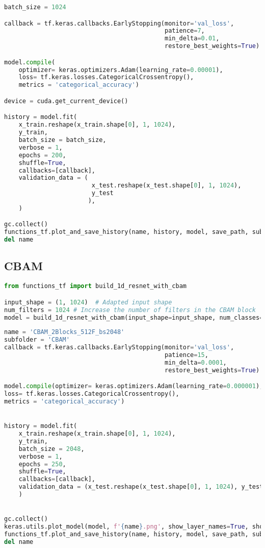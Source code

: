 \begin{lstlisting}[language=Python]
batch_size = 1024

callback = tf.keras.callbacks.EarlyStopping(monitor='val_loss', 
                                            patience=7, 
                                            min_delta=0.01,
                                            restore_best_weights=True)

model.compile(
    optimizer= keras.optimizers.Adam(learning_rate=0.00001),
    loss= tf.keras.losses.CategoricalCrossentropy(),
    metrics = 'categorical_accuracy')

device = cuda.get_current_device()

history = model.fit(
    x_train.reshape(x_train.shape[0], 1, 1024),
    y_train,
    batch_size = batch_size,
    verbose = 1,
    epochs = 200,
    shuffle=True,
    callbacks=[callback],
    validation_data = (
                        x_test.reshape(x_test.shape[0], 1, 1024),
                        y_test
                       ),
    )

gc.collect()
functions_tf.plot_and_save_history(name, history, model, save_path, subfolder=subfolder)
del name
\end{lstlisting}

\hypertarget{cbam}{%
\subsection*{CBAM}\label{cbam}}

\begin{lstlisting}[language=Python]
from functions_tf import build_1d_resnet_with_cbam

input_shape = (1, 1024)  # Adapted input shape
num_filters = 1024 # Increase the number of filters in the CBAM block
model = build_1d_resnet_with_cbam(input_shape=input_shape, num_classes=n_elements, num_filters=num_filters, output_shape=(1, n_elements), res_block_num=1)
\end{lstlisting}


\begin{lstlisting}[language=Python]
name = 'CBAM_2Blocks_512F_bs2048'
subfolder = 'CBAM'
callback = tf.keras.callbacks.EarlyStopping(monitor='val_loss', 
                                            patience=15,
                                            min_delta=0.0001,
                                            restore_best_weights=True)

model.compile(optimizer= keras.optimizers.Adam(learning_rate=0.000001),
loss= tf.keras.losses.CategoricalCrossentropy(),
metrics = 'categorical_accuracy')


history = model.fit(
    x_train.reshape(x_train.shape[0], 1, 1024),
    y_train,
    batch_size = 2048,
    verbose = 1,
    epochs = 250,
    shuffle=True,
    callbacks=[callback],
    validation_data = (x_test.reshape(x_test.shape[0], 1, 1024), y_test)
    )


gc.collect()
keras.utils.plot_model(model, f'{name}.png', show_layer_names=True, show_layer_activations=True, show_shapes=True)
functions_tf.plot_and_save_history(name, history, model, save_path, subfolder=subfolder)
del name
\end{lstlisting}

